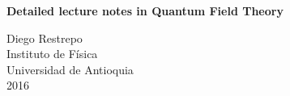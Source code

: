 \documentclass[12pt,letterpaper]{book}
\theoremstyle{example}
\newcommand{\tofc}[1]{#1} %
\begin{document}
\renewcommand{\thepage}{\roman{page}}
\begin{titlepage}
  \begin{center}

    
\textbf{\huge    Detailed lecture notes in Quantum Field Theory}

    

\vspace{4cm}
 Diego Restrepo\\
Instituto de Física\\
Universidad de Antioquia\\
2016
    
  \end{center}
\end{titlepage}





\tofc{
\renewcommand{\thepage}{\roman{page}}
\tableofcontents{}

\newpage{}
}

\renewcommand{\thepage}{\arabic{page}}
\setcounter{page}{1}










%









\end{document}
